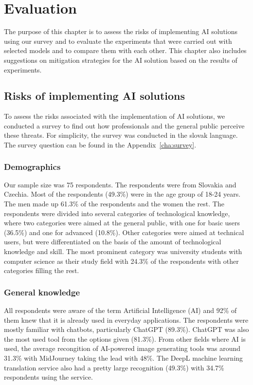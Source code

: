 \chapter{Evaluation \label{cha:eva}}

The purpose of this chapter is to assess the risks of implementing AI solutions using our survey and to evaluate the experiments that were carried out with selected models and to compare them with each other. This chapter also includes suggestions on mitigation strategies for the AI solution based on the results of experiments.

\section{Risks of implementing AI solutions \label{sec:eval_risks_survey}}
To assess the risks associated with the implementation of AI solutions, we conducted a survey to find out how professionals and the general public perceive these threats. For simplicity, the survey was conducted in the slovak language. The survey question can be found in the Appendix~\ref{cha:survey}.

\subsection*{Demographics}

Our sample size was 75 respondents. The respondents were from Slovakia and Czechia. Most of the respondents (49.3\%) were in the age group of 18-24 years. The men made up 61.3\% of the respondents and the women the rest. The respondents were divided into several categories of technological knowledge, where two categories were aimed at the general public, with one for basic users (36.5\%) and one for advanced (10.8\%). Other categories were aimed at technical users, but were differentiated on the basis of the amount of technological knowledge and skill. The most prominent category was university students with computer science as their study field with 24.3\% of the respondents with other categories filling the rest.

\subsection*{General knowledge}

All respondents were aware of the term Artificial Intelligence (AI) and 92\% of them knew that it is already used in everyday applications. The respondents were mostly familiar with chatbots, particularly ChatGPT (89.3\%). ChatGPT was also the most used tool from the options given (81.3\%). From other fields where AI is used, the average recongition of AI-powered image generating tools was around 31.3\% with MidJourney taking the lead with 48\%. The DeepL machine learning translation service also had a pretty large recognition (49.3\%) with 34.7\% respondents using the service.

